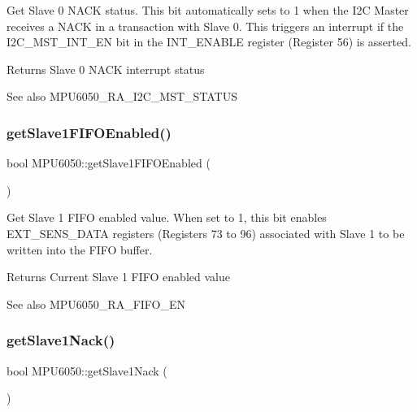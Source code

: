 Get Slave 0 N\+A\+CK status. This bit automatically sets to 1 when the I2C Master receives a N\+A\+CK in a transaction with Slave 0. This triggers an interrupt if the I2\+C\+\_\+\+M\+S\+T\+\_\+\+I\+N\+T\+\_\+\+EN bit in the I\+N\+T\+\_\+\+E\+N\+A\+B\+LE register (Register 56) is asserted. \begin{DoxyReturn}{Returns}
Slave 0 N\+A\+CK interrupt status 
\end{DoxyReturn}
\begin{DoxySeeAlso}{See also}
M\+P\+U6050\+\_\+\+R\+A\+\_\+\+I2\+C\+\_\+\+M\+S\+T\+\_\+\+S\+T\+A\+T\+US 
\end{DoxySeeAlso}
\mbox{\label{class_m_p_u6050_afd6a9b55a589c83c9a0fb0b5b2a88234}} 
\subsubsection{\texorpdfstring{getSlave1FIFOEnabled()}{getSlave1FIFOEnabled()}}
{\footnotesize\ttfamily bool M\+P\+U6050\+::get\+Slave1\+F\+I\+F\+O\+Enabled (\begin{DoxyParamCaption}{ }\end{DoxyParamCaption})}

Get Slave 1 F\+I\+FO enabled value. When set to 1, this bit enables E\+X\+T\+\_\+\+S\+E\+N\+S\+\_\+\+D\+A\+TA registers (Registers 73 to 96) associated with Slave 1 to be written into the F\+I\+FO buffer. \begin{DoxyReturn}{Returns}
Current Slave 1 F\+I\+FO enabled value 
\end{DoxyReturn}
\begin{DoxySeeAlso}{See also}
M\+P\+U6050\+\_\+\+R\+A\+\_\+\+F\+I\+F\+O\+\_\+\+EN 
\end{DoxySeeAlso}
\mbox{\label{class_m_p_u6050_a65cc9d75ff347b146414685fb83fa451}} 
\subsubsection{\texorpdfstring{getSlave1Nack()}{getSlave1Nack()}}
{\footnotesize\ttfamily bool M\+P\+U6050\+::get\+Slave1\+Nack (\begin{DoxyParamCaption}{ }\end{DoxyParamCaption})}

